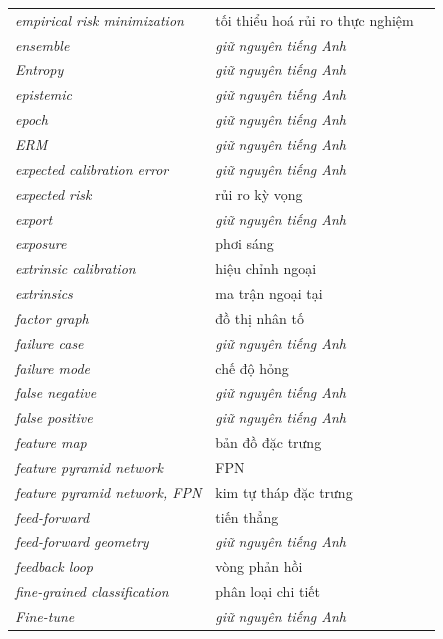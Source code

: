 \documentclass[deep_learning.tex]{subfiles}
\begin{document}
\begin{longtable}{@{}L{5.2cm}L{5.9cm}L{2.6cm}@{}}
\emph{empirical risk minimization} & tối thiểu hoá rủi ro thực nghiệm & \\
\emph{ensemble} & \emph{\color{tiercol}giữ nguyên tiếng Anh} & \\
\emph{Entropy} & \emph{\color{tiercol}giữ nguyên tiếng Anh} & \\
\emph{epistemic} & \emph{\color{tiercol}giữ nguyên tiếng Anh} & \\
\emph{epoch} & \emph{\color{tiercol}giữ nguyên tiếng Anh} & \\
\emph{ERM} & \emph{\color{tiercol}giữ nguyên tiếng Anh} & \\
\emph{expected calibration error} & \emph{\color{tiercol}giữ nguyên tiếng Anh} & \\
\emph{expected risk} & rủi ro kỳ vọng & \\
\emph{export} & \emph{\color{tiercol}giữ nguyên tiếng Anh} & \\
\emph{exposure} & phơi sáng & \\
\emph{extrinsic calibration} & hiệu chỉnh ngoại & \\
\emph{extrinsics} & ma trận ngoại tại & \\
\emph{factor graph} & đồ thị nhân tố & \\
\emph{failure case} & \emph{\color{tiercol}giữ nguyên tiếng Anh} & \\
\emph{failure mode} & chế độ hỏng & \\
\emph{false negative} & \emph{\color{tiercol}giữ nguyên tiếng Anh} & \\
\emph{false positive} & \emph{\color{tiercol}giữ nguyên tiếng Anh} & \\
\emph{feature map} & bản đồ đặc trưng & \\
\emph{feature pyramid network} & FPN & \\
\emph{feature pyramid network, FPN} & kim tự tháp đặc trưng & \\
\emph{feed-forward} & tiến thẳng & \\
\emph{feed-forward geometry} & \emph{\color{tiercol}giữ nguyên tiếng Anh} & \\
\emph{feedback loop} & vòng phản hồi & \\
\emph{fine-grained classification} & phân loại chi tiết & \\
\emph{Fine-tune} & \emph{\color{tiercol}giữ nguyên tiếng Anh} & \\

\end{longtable}
\end{document}
